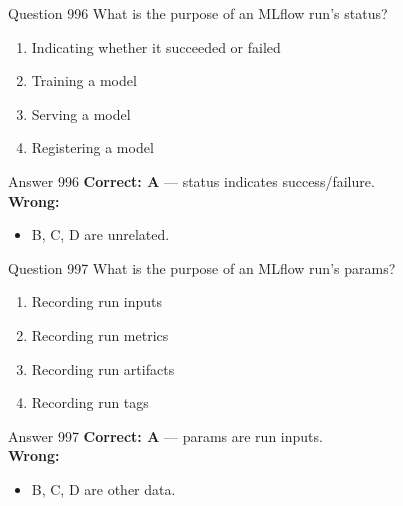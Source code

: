 \documentclass[aspectratio=169,11pt]{beamer}
\begin{document}
	\begin{frame}{Question 996}
		What is the purpose of an MLflow run's status?
		\begin{enumerate}[label=\Alph*.]
			\item Indicating whether it succeeded or failed
			\item Training a model
			\item Serving a model
			\item Registering a model
		\end{enumerate}
	\end{frame}
	\begin{frame}{Answer 996}
		\textbf{Correct: A} --- status indicates success/failure.\\
		\vspace{0.5em}
		\textbf{Wrong:}
		\begin{itemize}
			\item B, C, D are unrelated.
		\end{itemize}
	\end{frame}
	
	\begin{frame}{Question 997}
		What is the purpose of an MLflow run's params?
		\begin{enumerate}[label=\Alph*.]
			\item Recording run inputs
			\item Recording run metrics
			\item Recording run artifacts
			\item Recording run tags
		\end{enumerate}
	\end{frame}
	\begin{frame}{Answer 997}
		\textbf{Correct: A} --- params are run inputs.\\
		\vspace{0.5em}
		\textbf{Wrong:}
		\begin{itemize}
			\item B, C, D are other data.
		\end{itemize}
	\end{frame}
	
\end{document}
